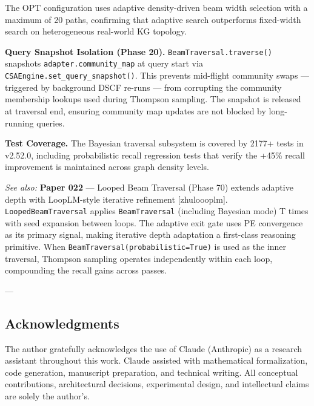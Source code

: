 The OPT confi\-guration uses adaptive density-driven beam width selection with a maximum of 20 paths, confirming that adaptive search outperforms fixed-width search on heter\-ogeneous real-world KG topology.

\textbf{Query Snapshot Isolation (Phase 20).} \texttt{BeamTraversal.traverse()} snapshots \texttt{adapter.community\_map} at query start via \texttt{CSAEngine.set\_query\_snapshot()}. This prevents mid-flight community swaps — triggered by background DSCF re-runs — from corrupting the community membership lookups used during Thompson sampling. The snapshot is released at traversal end, ensuring community map updates are not blocked by long-running queries.

\textbf{Test Coverage.} The Bayesian traversal subsystem is covered by 2177+ tests in v2.52.0, including proba\-bilistic recall regression tests that verify the +45\% recall improvement is maintained across graph density levels.

\textit{See also:} \textbf{Paper 022} — Looped Beam Traversal (Phase 70) extends adaptive depth with LoopLM-style iterative refinement [zhu\-loooplm]. \texttt{LoopedBeamTraversal} applies \texttt{BeamTraversal} (including Bayesian mode) T times with seed expansion between loops. The adaptive exit gate uses PE convergence as its primary signal, making iterative depth adaptation a first-class reasoning primitive. When \texttt{BeamTraversal(probabilistic=True)} is used as the inner traversal, Thompson sampling operates indep\-endently within each loop, compounding the recall gains across passes.

---
\subsection{Acknow\-ledgments}

The author gratefully ackno\-wledges the use of Claude (Anthropic) as a research assistant throughout this work. Claude assisted with mathe\-matical forma\-lization, code generation, manuscript preparation, and technical writing. All conceptual contr\-ibutions, archi\-tectural decisions, exper\-imental design, and intel\-lectual claims are solely the author's.

